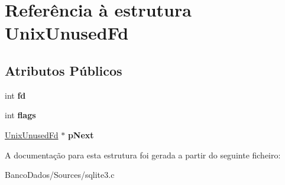 \hypertarget{struct_unix_unused_fd}{\section{Referência à estrutura Unix\-Unused\-Fd}
\label{struct_unix_unused_fd}
}
\subsection*{Atributos Públicos}
\begin{DoxyCompactItemize}
\item 
\hypertarget{struct_unix_unused_fd_a3f1a6127218af971aeb7b131c9c1600d}{int {\bfseries fd}}\label{struct_unix_unused_fd_a3f1a6127218af971aeb7b131c9c1600d}

\item 
\hypertarget{struct_unix_unused_fd_a744cd118bd91ec2019108e8205708684}{int {\bfseries flags}}\label{struct_unix_unused_fd_a744cd118bd91ec2019108e8205708684}

\item 
\hypertarget{struct_unix_unused_fd_a6bbcba75beeabdd2df126638bc1d8bc0}{\hyperlink{struct_unix_unused_fd}{Unix\-Unused\-Fd} $\ast$ {\bfseries p\-Next}}\label{struct_unix_unused_fd_a6bbcba75beeabdd2df126638bc1d8bc0}

\end{DoxyCompactItemize}


A documentação para esta estrutura foi gerada a partir do seguinte ficheiro\-:\begin{DoxyCompactItemize}
\item 
Banco\-Dados/\-Sources/sqlite3.\-c\end{DoxyCompactItemize}

